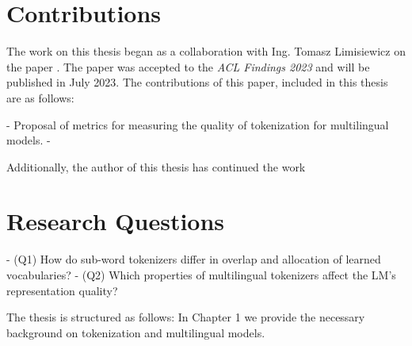 \section{Contributions}



The work on this thesis began as a collaboration with Ing. Tomasz Limisiewicz on the paper . The paper was accepted to the \textit{ACL Findings 2023} and will be published in July 2023. The contributions of this paper, included in this thesis are as follows:

- Proposal of metrics for measuring the quality of tokenization for multilingual models.
- 

Additionally, the author of this thesis has continued the work 


\section{Research Questions}

- (Q1) How do sub-word tokenizers differ in overlap and allocation of learned vocabularies?
- (Q2) Which properties of multilingual tokenizers affect the LM’s representation quality?


The thesis is structured as follows: In Chapter 1 we provide the necessary background on tokenization and multilingual models. 

